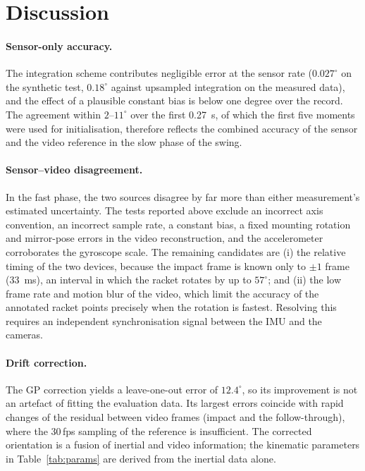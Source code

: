 \documentclass[11pt,a4paper]{article}
\newcommand{\dg}{^{\circ}}
\begin{document}
\section{Discussion}
\paragraph{Sensor-only accuracy.} The integration scheme contributes negligible error at the sensor
rate ($0.027\dg$ on the synthetic test, $0.18\dg$ against upsampled integration on the measured
data), and the effect of a plausible constant bias is below one degree over the record. The
agreement within $2$--$11\dg$ over the first \SI{0.27}{s}, of which the first five moments were
used for initialisation, therefore reflects the combined accuracy of the sensor and the video
reference in the slow phase of the swing.

\paragraph{Sensor--video disagreement.} In the fast phase, the two sources disagree by far more
than either measurement's estimated uncertainty. The tests reported above exclude an incorrect axis
convention, an incorrect sample rate, a constant bias, a fixed mounting rotation and mirror-pose
errors in the video reconstruction, and the accelerometer corroborates the gyroscope scale. The
remaining candidates are (i) the relative timing of the two devices, because the impact frame is
known only to $\pm1$ frame (\SI{33}{ms}), an interval in which the racket rotates by up to
$57\dg$; and (ii) the low frame rate and motion blur of the video, which limit the accuracy of the
annotated racket points precisely when the rotation is fastest. Resolving this requires an
independent synchronisation signal between the IMU and the cameras.

\paragraph{Drift correction.} The GP correction yields a leave-one-out error of $12.4\dg$, so its
improvement is not an artefact of fitting the evaluation data. Its largest errors coincide with
rapid changes of the residual between video frames (impact and the follow-through), where the
30\,fps sampling of the reference is insufficient. The corrected orientation is a fusion of
inertial and video information; the kinematic parameters in Table~\ref{tab:params} are derived from
the inertial data alone.
\end{document}
